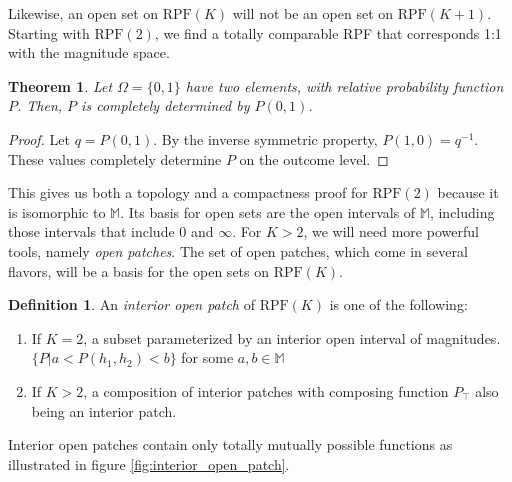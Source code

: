 \documentclass[twoside]{article}
\theoremstyle{plain}%
\newtheorem{theorem}{Theorem}[section]
\theoremstyle{definition}
\newtheorem{definition}{Definition}[section]
\theoremstyle{remark}
\begin{document}
\begin{appendices}
Likewise, an open set on \(\text{RPF}(K)\) will not be an open set on \(\text{RPF}(K+1)\). Starting with \(\text{RPF}(2)\), we find a totally comparable RPF that corresponds 1:1 with the magnitude space.

\begin{theorem}
Let \(\Omega = \{0, 1\}\) have two elements, with relative probability function \(P\). Then, \(P\) is completely determined by \(P(0, 1)\).
\end{theorem}

\begin{proof}
Let \(q = P(0, 1)\). By the inverse symmetric property, \(P(1, 0) = q^{-1}\). These values completely determine \(P\) on the outcome level.
\end{proof}

This gives us both a topology and a compactness proof for \(\text{RPF}(2)\) because it is isomorphic to \(\mathbb{M}\). Its basis for open sets are the open intervals of \(\mathbb{M}\), including those intervals that include 0 and \(\infty\). For \(K > 2\), we will need more powerful tools, namely \textit{open patches}. The set of open patches, which come in several flavors, will be a basis for the open sets on \(\text{RPF}(K)\).

\begin{definition}
An \textit{interior open patch} of \(\text{RPF}(K)\) is one of the following:

\begin{enumerate}
  \item If \(K = 2\), a subset parameterized by an interior open interval of magnitudes. \(\{P | a < P(h_1, h_2) < b\}\) for some \(a, b \in \mathbb{M}\) 
  \item If \(K > 2\), a composition of interior patches with composing function \(P_{\top}\) also being an interior patch.
\end{enumerate}
\end{definition}

Interior open patches contain only totally mutually possible functions as illustrated in figure \ref{fig:interior_open_patch}.

\begin{figure}[h]
\centering
{}
 \hspace{3em}
\end{figure}
\end{appendices}
\end{document}
